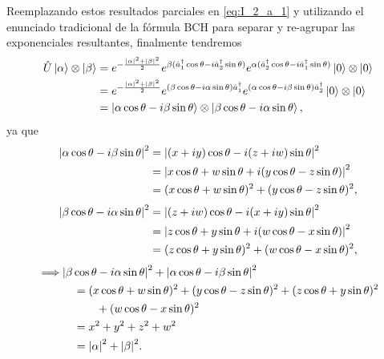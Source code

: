 \documentclass{scrartcl}
\renewcommand{\a}{\hat{a}}
\DeclareRobustCommand{\[}{\begin{equation}}
\DeclareRobustCommand{\]}{\end{equation}}
\begin{document}
\begin{enumerate}
\begin{enumerate}
        Reemplazando estos resultados parciales en \eqref{eq:I_2_a_1} y utilizando el enunciado tradicional de la fórmula BCH para separar y re-agrupar las exponenciales resultantes, finalmente tendremos
        \begin{align}
            \hat U \ket{\alpha} \otimes \ket{\beta} &= e^{-\frac{\abs{\alpha}^2 + \abs{\beta}^2}{2}} e^{\beta (\a_1^\dagger \cos\theta - i \a_2^\dagger \sin\theta)} e^{\alpha (\a_2^\dagger \cos\theta - i \a_1^\dagger \sin\theta)} \ket{0} \otimes \ket{0} \\
                &= e^{-\frac{\abs{\alpha}^2 + \abs{\beta}^2}{2}} e^{(\beta \cos\theta - i \alpha \sin\theta) \a_1^\dagger} e^{(\alpha \cos\theta - i \beta \sin\theta) \a_2^\dagger} \ket{0} \otimes \ket{0} \\
                &= \ket{\alpha \cos\theta - i \beta \sin\theta} \otimes \ket{\beta \cos\theta - i \alpha \sin\theta},
        \end{align}
        ya que
        \begin{align}
            \abs{\alpha \cos\theta - i \beta \sin\theta}^2 &= \abs{(x + i y) \cos\theta - i (z + i w) \sin\theta}^2 \\
                &= \abs{x \cos\theta + w \sin\theta + i (y \cos\theta - z \sin\theta)}^2 \\
                &= (x \cos\theta + w \sin\theta)^2 + (y \cos\theta - z \sin\theta)^2,
        \end{align}
        \begin{align}
            \abs{\beta \cos\theta - i \alpha \sin\theta}^2 &= \abs{(z + i w) \cos\theta - i (x + i y) \sin\theta}^2 \\
                &= \abs{z \cos\theta + y \sin\theta + i (w \cos\theta - x \sin\theta)}^2 \\
                &= (z \cos\theta + y \sin\theta)^2 + (w \cos\theta - x \sin\theta)^2,
        \end{align}
        \begin{align}
            \implies &\abs{\beta \cos\theta - i \alpha \sin\theta}^2 + \abs{\alpha \cos\theta - i \beta \sin\theta}^2 \\
                &\quad = (x \cos\theta + w \sin\theta)^2 + (y \cos\theta - z \sin\theta)^2 + (z \cos\theta + y \sin\theta)^2 \\
                    &\quad\quad\quad + (w \cos\theta - x \sin\theta)^2 \\
                &\quad = x^2 + y^2 + z^2 + w^2 \\
                &\quad = \abs{\alpha}^2 + \abs{\beta}^2.
        \end{align}
    

\end{enumerate}
\end{enumerate}
\end{document}
